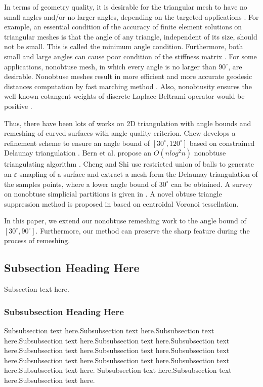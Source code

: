 \documentclass[10pt,journal,cspaper,compsoc]{IEEEtran}
\begin{document}
In terms of geometry quality, it is desirable for the triangular mesh to have no small angles and/or no larger angles, depending on the targeted applications \cite{S2002}. For example, an essential condition of the accuracy of finite element solutions on triangular meshes is that the angle of any triangle, independent of its size, should not be small. This is called the minimum angle condition. Furthermore, both small and large angles can cause poor condition of the stiffness matrix \cite{S2002}. For some applications, nonobtuse mesh, in which every angle is no larger than $90^{\circ}$, are desirable. Nonobtuse meshes result in more efficient and more accurate geodesic distances computation by fast marching method \cite{KS1998}. Also, nonobtusity ensures the well-known cotangent weights of discrete Laplace-Beltrami operator would be positive \cite{WMKG2007}.

Thus, there have been lots of works on 2D triangulation with angle bounds and remeshing of curved surfaces with angle quality criterion. Chew develops a refinement scheme to ensure an angle bound of $[30^{\circ}, 120^{\circ}]$ based on constrained Delaunay triangulation \cite{C1993}. Bern et al. propose an $O(nlog^{2}n)$ nonobtuse triangulating algorithm \cite{BMR1994}. Cheng and Shi \cite{CS2005} use restricted union of balls to generate an $\varepsilon$-smapling of a surface and extract a mesh form the Delaunay triangulation of the samples points, where a lower angle bound of $30^{\circ}$ can be obtained. A survey on nonobtuse simplicial partitions is given in \cite{JKKS2009}. A novel obtuse triangle suppression method is proposed in \cite{SCWYLL2011} based on centroidal Voronoi tessellation. 

In this paper, we extend our nonobtuse remeshing work \cite{LZ2006} to the angle bound of $[30^{\circ}, 90^{\circ}]$. Furthermore, our method can preserve the sharp feature during the process of remeshing.  


\subsection{Subsection Heading Here}
Subsection text here.


\subsubsection{Subsubsection Heading Here}
Subsubsection text here.Subsubsection text here.Subsubsection text here.Subsubsection text here.Subsubsection text here.Subsubsection text here.Subsubsection text here.Subsubsection text here.Subsubsection text here.Subsubsection text here.Subsubsection text here.Subsubsection text here.Subsubsection text here.
Subsubsection text here.Subsubsection text here.Subsubsection text here.
\end{document}
